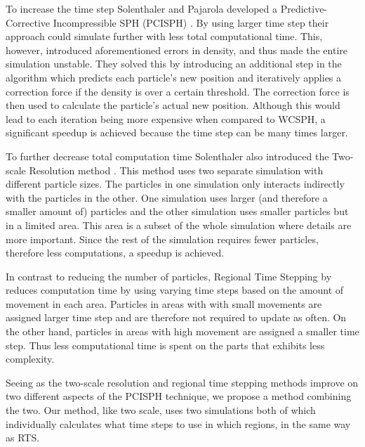 \documentclass[../../main.tex]{subfiles}
\begin{document}
To increase the time step Solenthaler and Pajarola developed a Predictive-Corrective Incompressible SPH (PCISPH) \citep{solenthaler2009predictive}. By using larger time step their approach could simulate further with less total computational time. This, however, introduced aforementioned errors in density, and thus made the entire simulation unstable. They solved this by introducing an additional step in the algorithm which predicts each particle's new position and iteratively applies a correction force if the density is over a certain threshold. The correction force is then used to calculate the particle's actual new position. Although this would lead to each iteration being more expensive when compared to WCSPH, a significant speedup is achieved because the time step can be many times larger.

To further decrease total computation time Solenthaler also introduced the Two-scale Resolution method \citep{solenthaler2011two}. This method uses two separate simulation with different particle sizes. The particles in one simulation only interacts indirectly with the particles in the other. One simulation uses larger (and therefore a smaller amount of) particles and the other simulation uses smaller particles but in a limited area. This area is a subset of the whole simulation where details are more important. Since the rest of the simulation requires fewer particles, therefore less computations, a speedup is achieved. 

In contrast to reducing the number of particles, Regional Time Stepping by \citet{goswami2014regional} reduces computation time by using varying time steps based on the amount of movement in each area. Particles in areas with with small movements are assigned larger time step and are therefore not required to update as often. On the other hand, particles in areas with high movement are assigned a smaller time step. Thus less computational time is spent on the parts that exhibits less complexity.

Seeing as the two-scale resolution and regional time stepping methods improve on two different aspects of the PCISPH technique, we propose a method combining the two. Our method, like two scale, uses two simulations both of which individually calculates what time steps to use in which regions, in the same way as RTS. 

\end{document}

